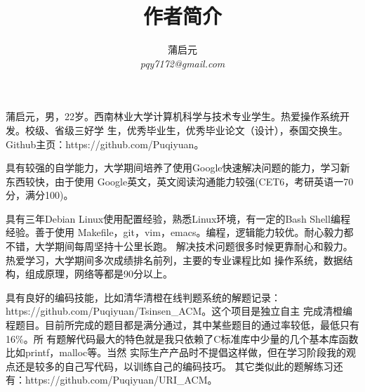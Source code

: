 \documentclass{wx672article} %
\title{作者简介}
\author{蒲启元 \\
\emph{pqy7172@gmail.com}}
\begin{document}
\maketitle{}

蒲启元，男，22岁。西南林业大学计算机科学与技术专业学生。热爱操作系统开发。校级、省级三好学
生，优秀毕业生，优秀毕业论文（设计），泰国交换生。Github主页：https://github.com/Puqiyuan。

具有较强的自学能力，大学期间培养了使用Google快速解决问题的能力，学习新东西较快，由于使用
Google英文，英文阅读沟通能力较强(CET6，考研英语一70分，满分100)。

具有三年Debian Linux使用配置经验，熟悉Linux环境，有一定的Bash Shell编程经验。善于使用
Makefile，git，vim，emacs。编程，逻辑能力较优。耐心毅力都不错，大学期间每周坚持十公里⻓跑。
解决技术问题很多时候更靠耐心和毅力。热爱学习，大学期间多次成绩排名前列，主要的专业课程比如
操作系统，数据结构，组成原理，网络等都是90分以上。

具有良好的编码技能，比如清华清橙在线判题系统的解题记录：
https://github.com/Puqiyuan/Tsinsen\_ACM。这个项目是独立自主
完成清橙编程题目。目前所完成的题目都是满分通过，其中某些题目的通过率较低，最低只有16\%。所
有题解代码最大的特色就是我只依赖了C标准库中少量的几个基本库函数比如printf，malloc等。当然
实际生产产品时不提倡这样做，但在学习阶段我的观点还是较多的自己写代码，以训练自己的编码技巧。
其它类似此的题解练习还有：https://github.com/Puqiyuan/URI\_ACM。
\end{document}
